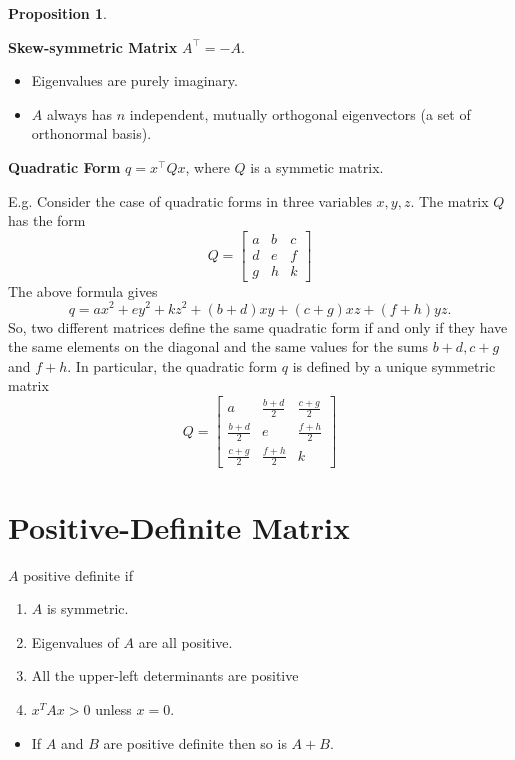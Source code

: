 \documentclass[14pt]{article}
\newtheorem{proposition}[theorem]{Proposition}
\theoremstyle{definition}
\theoremstyle{remark}
\begin{document}
\begin{multicols}{2}
\begin{proposition}
    \end{proposition}
    \textbf{Skew-symmetric Matrix}
    $A^\top=-A$.
    \begin{itemize}
        \item Eigenvalues are purely imaginary.
        \item $A$ always has $n$ independent, mutually orthogonal eigenvectors (a set of orthonormal basis).
    \end{itemize}
    \textbf{Quadratic Form}
    $q = x^\top Q x$, where $Q$ is a symmetic matrix.

    E.g. Consider the case of quadratic forms in three variables $x, y, z$. The matrix $Q$ has the form
    $$
        Q=\begin{bmatrix}
            a & b & c \\
            d & e & f \\
            g & h & k
        \end{bmatrix}
    $$
    The above formula gives
    $$
        q=a x^2+e y^2+k z^2+(b+d) x y+(c+g) x z+(f+h) y z .
    $$
    So, two different matrices define the same quadratic form if and only if they have the same elements on the diagonal and the same values for the sums $b+d, c+g$ and $f+h$. In particular, the quadratic form $q$ is defined by a {\color{blue}unique} symmetric matrix
    $$
        Q=\begin{bmatrix}
            a             & \frac{b+d}{2} & \frac{c+g}{2} \\
            \frac{b+d}{2} & e             & \frac{f+h}{2} \\
            \frac{c+g}{2} & \frac{f+h}{2} & k
        \end{bmatrix}
    $$

    \section{Positive-Definite Matrix}
    $A$ positive definite if
    \begin{enumerate}
        \item $A$ is symmetric.
        \item Eigenvalues of $A$ are all positive.
        \item All the upper-left determinants are positive
        \item $x^{T} A x>0$ unless $x=0$.
    \end{enumerate}

    \begin{itemize}
        \item  If $A$ and $B$ are positive definite then so is $A+B$.
    \end{itemize}


\end{multicols}
\end{document}
